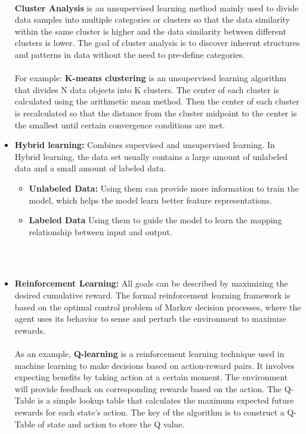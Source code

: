 \documentclass[english,version-2022-01]{uzl-thesis}
\begin{document}
\begin{itemize}
    \\
    \textbf{Cluster Analysis} is an unsupervised learning method mainly used to divide data samples into multiple categories or clusters so that the data similarity within the same cluster is higher and the data similarity between different clusters is lower.\cite{inbook} The goal of cluster analysis is to discover inherent structures and patterns in data without the need to pre-define categories.\\
    \\
    For example: \textbf{K-means clustering} is an unsupervised learning algorithm that divides N data objects into K clusters. The center of each cluster is calculated using the arithmetic mean method. Then the center of each cluster is recalculated so that the distance from the cluster midpoint to the center is the smallest until certain convergence conditions are met.\cite{sinaga2020unsupervised}\\
    \item \textbf{Hybrid learning:} Combines supervised and unsupervised learning. In Hybrid learning, the data set usually contains a large amount of unlabeled data and a small amount of labeled data.\cite{shon2007hybrid}
    \begin{itemize}
        \item \textbf{Unlabeled Data:} Using them can provide more information to train the model, which helps the model learn better feature representations.
        \item \textbf{Labeled Data} Using them to guide the model to learn the mapping relationship between input and output.
    \end{itemize}\\
    \\
    \item \textbf{Reinforcement Learning:} All goals can be described by maximizing the desired cumulative reward. The formal reinforcement learning framework is based on the optimal control problem of Markov decision processes, where the agent uses its behavior to sense and perturb the environment to maximize rewards.\cite{MarkovDecisionProcesses}\\
    \\
    As an example, \textbf{Q-learning} is a reinforcement learning technique used in machine learning to make decisions based on action-reward pairs. It involves expecting benefits by taking action at a certain moment. The environment will provide feedback on corresponding rewards based on the action. The Q-Table is a simple lookup table that calculates the maximum expected future rewards for each state's action. The key of the algorithm is to construct a Q-Table of state and action to store the Q value.\cite{melo2001convergence}\\

\end{itemize}
\end{document}
